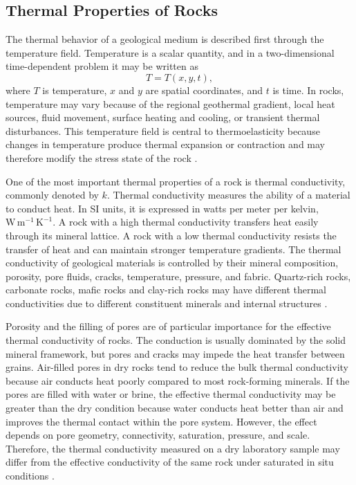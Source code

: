 \subsection{Thermal Properties of Rocks}

The thermal behavior of a geological medium is described first through the temperature field. Temperature is a scalar quantity, and in a two-dimensional time-dependent problem it may be written as
\begin{equation}
T = T(x,y,t),
\end{equation}
where \(T\) is temperature, \(x\) and \(y\) are spatial coordinates, and \(t\) is time. In rocks, temperature may vary because of the regional geothermal gradient, local heat sources, fluid movement, surface heating and cooling, or transient thermal disturbances. This temperature field is central to thermoelasticity because changes in temperature produce thermal expansion or contraction and may therefore modify the stress state of the rock \cite{robertson1988,turcotte2014}.

One of the most important thermal properties of a rock is thermal conductivity, commonly denoted by \(k\). Thermal conductivity measures the ability of a material to conduct heat. In SI units, it is expressed in watts per meter per kelvin, \(\mathrm{W\,m^{-1}\,K^{-1}}\). A rock with a high thermal conductivity transfers heat easily through its mineral lattice. A rock with a low thermal conductivity resists the transfer of heat and can maintain stronger temperature gradients. The thermal conductivity of geological materials is controlled by their mineral composition, porosity, pore fluids, cracks, temperature, pressure, and fabric. Quartz-rich rocks, carbonate rocks, mafic rocks and clay-rich rocks may have different thermal conductivities due to different constituent minerals and internal structures \cite{robertson1988,mavko2009}.

Porosity and the filling of pores are of particular importance for the effective thermal conductivity of rocks. The conduction is usually dominated by the solid mineral framework, but pores and cracks may impede the heat transfer between grains. Air-filled pores in dry rocks tend to reduce the bulk thermal conductivity because air conducts heat poorly compared to most rock-forming minerals. If the pores are filled with water or brine, the effective thermal conductivity may be greater than the dry condition because water conducts heat better than air and improves the thermal contact within the pore system. However, the effect depends on pore geometry, connectivity, saturation, pressure, and scale. Therefore, the thermal conductivity measured on a dry laboratory sample may differ from the effective conductivity of the same rock under saturated in situ conditions \cite{robertson1988,wolff1982}.

